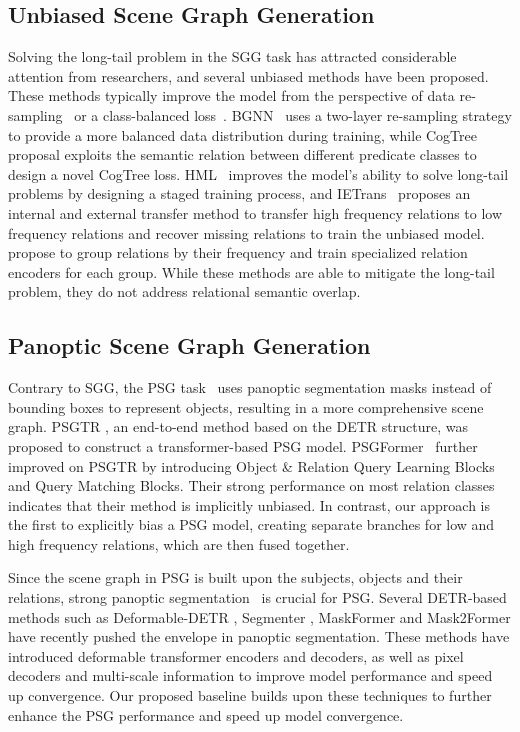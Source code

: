 \subsection{Unbiased Scene Graph Generation}
Solving the long-tail problem in the SGG task has attracted considerable attention from researchers, and several unbiased methods \citep{tang2020unbiased, yu2020cogtree, chiou2021recovering, desai2021learning, guo2021general, li2021bipartite, dong2022stacked, goel2022not, li2022devil, li2022ppdl, deng2022hierarchical, zhang2022fine} have been proposed.
These methods typically improve the model from the perspective of data re-sampling~\citep{li2021bipartite} or a class-balanced loss~\citep{kang2023skew}.
BGNN~\citep{li2021bipartite} uses a two-layer re-sampling strategy to provide a more balanced data distribution during training, while CogTree \citep{yu2020cogtree} proposal exploits the semantic relation between different predicate classes to design a novel CogTree loss.
HML~\citep{deng2022hierarchical} improves the model's ability to solve long-tail problems by designing a staged training process, and IETrans~\citep{zhang2022fine} proposes an internal and external transfer method to transfer high frequency relations to low frequency relations and recover missing relations to train the unbiased model.
%
\citet{dong2022stacked} propose to group relations by their frequency and train specialized relation encoders for each group. 
While these methods are able to mitigate the long-tail problem, they do not address relational semantic overlap.

\subsection{Panoptic Scene Graph Generation}
Contrary to SGG, the PSG task~\citep{yang2022panoptic} uses panoptic segmentation masks instead of bounding boxes to represent objects, resulting in a more comprehensive scene graph.
PSGTR \citep{yang2022panoptic}, an end-to-end method based on the DETR structure, was proposed to construct a transformer-based PSG model.
PSGFormer~\citep{yang2022panoptic} further improved on PSGTR by introducing Object \& Relation Query Learning Blocks and Query Matching Blocks. Their strong performance on most relation classes indicates that their method is implicitly unbiased. In contrast, our approach is the first to explicitly bias a PSG model, creating separate branches for low and high frequency relations, which are then fused together.

Since the scene graph in PSG is built upon the subjects, objects and their relations, strong panoptic segmentation~\citep{kirillov2019panoptic} is crucial for PSG.
%
Several DETR-based \citep{carion2020end} methods such as Deformable-DETR \citep{zhu2020deformable}, Segmenter \citep{strudel2021segmenter}, MaskFormer \citep{cheng2021per} and Mask2Former \citep{cheng2022masked} have recently pushed the envelope in panoptic segmentation.
%
These methods have introduced deformable transformer encoders and decoders, as well as pixel decoders and multi-scale information to improve model performance and speed up convergence.
%
Our proposed baseline builds upon these techniques to further enhance the PSG performance and speed up model convergence.

